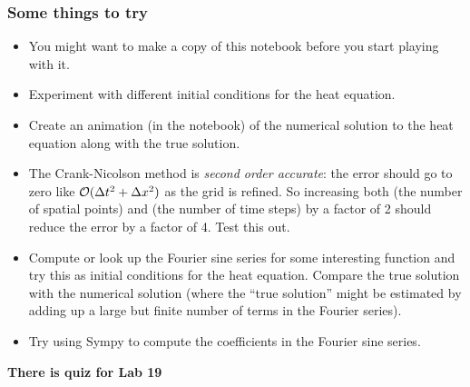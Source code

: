 \documentclass[letterpaper,10pt,english]{sphinxmanual}
\begin{document}
\subsubsection{Some things to try}
\label{labs/lab19:some-things-to-try}\begin{itemize}
\item {} 
You might want to make a copy of this notebook before you start playing
with it.

\item {} 
Experiment with different initial conditions for the heat equation.

\item {} 
Create an animation (in the notebook) of the numerical solution to the
heat equation along with the true solution.

\item {} 
The Crank-Nicolson method is \emph{second order accurate}: the error should
go to zero like \({\cal O}(\Delta t^2 + \Delta x^2)\) as the grid is
refined.  So increasing both  (the number of spatial points) and
 (the number of time steps) by a factor of 2 should reduce the
error by a factor of 4.  Test this out.

\item {} 
Compute or look up the Fourier sine series for some interesting function
and try this as initial conditions for the heat equation.  Compare the
true solution with the numerical solution (where the ``true solution'' might
be estimated by adding up a large but finite number of terms in the
Fourier series).

\item {} 
Try using Sympy to compute the coefficients in the Fourier sine series.

\end{itemize}

\textbf{There is quiz for Lab 19}
\end{document}
